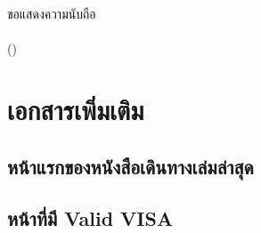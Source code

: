 \documentclass[a4paper,13pt]{article}
\begin{document}
\noindent
\hspace{3.5in}ขอแสดงความนับถือ \\

\indent\hspace{2.6in} \\
\indent\hspace{2.9in}() \\


\newpage
\setcounter{page}{2}

\section{เอกสารเพิ่มเติม}
\subsection{หน้าแรกของหนังสือเดินทางเล่มล่าสุด}
% 
% 

\subsection{หน้าที่มี Valid VISA}
% 
% 
\end{document}

